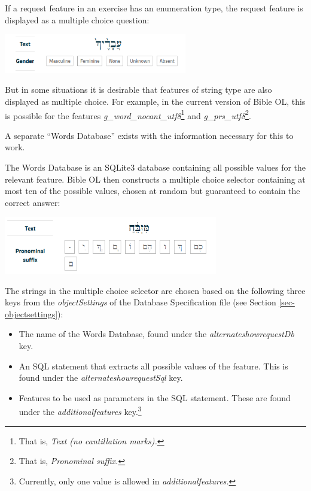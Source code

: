 \documentclass[11pt,oneside,a4paper]{memoir}
\begin{document}
If a request feature in an exercise has an
enumeration type, the request feature is displayed as a multiple choice question:

\begin{center}
  \includegraphics[width=0.6\textwidth]{gender.png}
\end{center}

But in some situations it is desirable that features of string type are also displayed as multiple
choice. For example, in the current version of Bible OL, this is possible for the features
\emph{g\_word\_nocant\_utf8}\footnote{That is, \emph{Text (no cantillation marks).}} and
\emph{g\_prs\_utf8}\footnote{That is, \emph{Pronominal suffix.}}.

A separate ``Words Database'' exists with the information necessary for this to work.

The Words Database is an SQLite3 database containing all possible values for the relevant feature.
Bible OL then constructs a multiple choice selector containing at most ten of the possible values, chosen at
random but guaranteed to contain the correct answer:

\begin{center}
  \includegraphics[width=0.7\textwidth]{pronsuf.png}
\end{center}

The strings in the multiple choice selector are chosen based on the following three keys from the
\emph{objectSettings} of the Database Specification file (see Section
\ref{sec-objectsettings}):

\begin{itemize}
\item The name of the Words Database, found under the \emph{alternateshowrequestDb} key.
\item An SQL statement that extracts all possible values of the feature. This is found under the
  \emph{alternateshowrequestSql} key.
\item Features to be used as parameters in the SQL statement. These are found under the
  \emph{additionalfeatures} key.\footnote{Currently, only one value is allowed in \emph{additionalfeatures.}}
\end{itemize}
\end{document}
